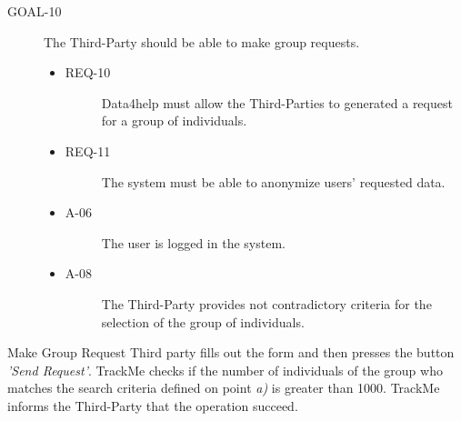 \documentclass[a4paper]{article}
\newcommand{\requirement}{\ding{229}}%
\begin{document}
        \begin{description}
        	\item[GOAL-10] The Third-Party should be able to make group requests. 
            	\begin{itemize}
            	    \item[\requirement]
                	\begin{description}
                	\item[REQ-10] Data4help must allow the Third-Parties to generated a request for a group of individuals. 
                	\end{description}
                	\item[\requirement]
                	\begin{description}
                	\item[REQ-11] The system must be able to anonymize users' requested data. 
                	\end{description}
                	\item
                	\begin{description}
                	\item[A-06] The user is logged in the system.
                	\end{description}
                	\item
                	\begin{description}
                	\item[A-08] The Third-Party provides not contradictory criteria for the selection of the group of individuals.
                	\end{description}
                	\end{itemize}
        \end{description}
        
        \begin{usecase}{Make Group Request}
        {Third party fills out the form and then presses the button \textit{'Send Request'}.}
        {TrackMe checks if the number of individuals of the group who matches the search criteria defined on point \textit{a)} is greater than 1000.}
        {TrackMe informs the Third-Party that the operation succeed.}
        \end{usecase}
        
\end{document}

